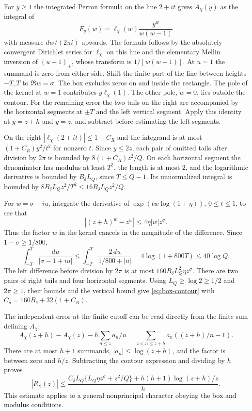 For \(y\ge1\) the integrated Perron formula on the line \(2+it\)
gives \(A_\chi(y)\) as the integral of
\[
      F_y(w)=\ell_\chi(w)\frac{y^w}{w(w-1)}
\]
with measure \(dw/(2\pi i)\) upwards. The formula follows by the
absolutely convergent Dirichlet series for \(\ell_\chi\) on this
line and the elementary Mellin inversion of \((u-1)_+\), whose
transform is \(1/[w(w-1)]\). At \(u=1\) the summand is zero from
either side. Shift the finite part of the line between heights
\(-T,T\) to \(\Re w=\sigma\). The box excludes zeros on and
inside the rectangle. The pole of the kernel at \(w=1\)
contributes \(y\ell_\chi(1)\). The other pole, \(w=0\), lies outside the contour.
For the remaining error the two tails on the right are accompanied
by the horizontal segments at \(\pm T\) and the left vertical
segment. Apply this identity at \(y=z+h\) and \(y=z\), and
subtract before estimating the left segments.

On the right \(|\ell_\chi(2+it)|\le1+C_R\) and the integrand
is at most \((1+C_R)y^2/t^2\) for nonzero \(t\).
Since \(y\le2z\), each pair of omitted tails after division
by \(2\pi\) is bounded by \(8(1+C_R)z^2/Q\). On each horizontal
segment the denominator has modulus at least \(T^2\), the length
is at most \(2\), and the logarithmic derivative is bounded by
\(B_\delta L_Q\), since \(T\le Q-1\). Its unnormalized integral
is bounded by \(8B_\delta L_Q z^2/T^2\le16B_\delta L_Q z^2/Q\).

For \(w=\sigma+iu\), integrate the derivative of
\(\exp(tw\log(1+\eta))\), \(0\le t\le1\), to see that
\[
 |(z+h)^w-z^w|\le4\eta |w|z^\sigma .
\]
Thus the factor \(w\) in the kernel cancels in the magnitude of the
difference. Since \(1-\sigma\ge1/800\),
\[
 \int_{-T}^T\frac{du}{|\sigma-1+iu|}
 \le\int_{-T}^T\frac{2\,du}{1/800+|u|}
 =4\log(1+800T)\le40\log Q .
\]
The left difference before division by \(2\pi\) is at most
\(160 B_\delta L_Q^2\eta z^\sigma\). There are two pairs of
right tails and four horizontal segments. Using
\(L_Q\ge\log2\ge1/2\) and \(2\pi\ge1\), their bounds and
the vertical bound give \eqref{eq:box-contour} with
\(C_\delta=160B_\delta+32(1+C_R)\).

The independent error at the finite cutoff can be read directly
from the finite sum defining \(A_\chi\):
\[
 A_\chi(z+h)-A_\chi(z)-h\sum_{n\le z}a_n/n
     =\sum_{z<n\le z+h}a_n((z+h)/n-1).
\]
There are at most \(h+1\) summands, \(|a_n|\le\log(z+h)\),
and the factor is between zero and \(h/z\). Subtracting the
contour expression and dividing by \(h\) proves
\begin{equation}
 |R_\chi(z)|\le
 \frac{C_\delta L_Q\{L_Q\eta z^\sigma+z^2/Q\}
              +h(h+1)\log(z+h)/z}{h}.
 \label{eq:box-tail}
\end{equation}
This estimate applies to a general nonprincipal character obeying
the box and modulus conditions.

